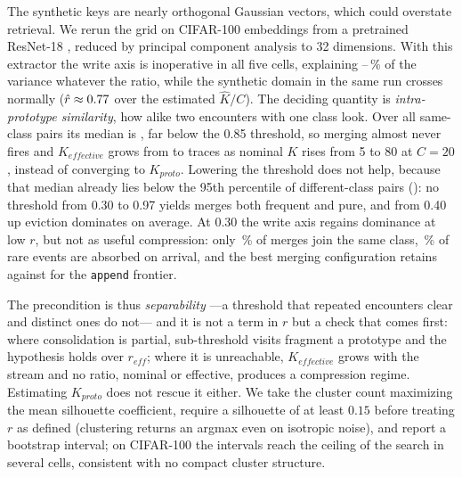 \documentclass[conference]{IEEEtran}
\begin{document}
The synthetic keys are nearly orthogonal Gaussian vectors, which could
overstate retrieval. We rerun the grid on CIFAR-100 \cite{krizhevsky2009}
embeddings from a pretrained ResNet-18 \cite{he2016}, reduced by principal
component analysis to 32 dimensions. With this extractor the write axis is
inoperative in all five cells, explaining
--\,\%
of the variance whatever the ratio, while the synthetic domain in the same run
crosses normally
($\hat r \approx \result{exp05_real_embeddings:dominios.synthetic.r_umbral|f2}{0.77}$
over the estimated $\hat K/C$). The deciding quantity is \emph{intra-prototype
similarity}, how alike two encounters with one class look. Over all
same-class pairs its median is
,
far below the 0.85 threshold, so merging almost never fires and
$K_{effective}$ grows from
 to
traces as nominal $K$ rises from 5 to 80 at $C=20$, instead of converging to
$K_{proto}$. Lowering the threshold does not help, because that median
already lies below the 95th percentile of different-class pairs
():
no threshold from 0.30 to 0.97 yields merges both frequent and pure, and from
0.40 up eviction dominates on average. At 0.30 the write axis regains dominance
at low $r$, but not as useful compression: only
\,\%
of merges join the same class,
\,\%
of rare events are absorbed on arrival, and the best merging configuration
retains
against
for the \texttt{append} frontier.

The precondition is thus \emph{separability} ---a threshold that repeated
encounters clear and distinct ones do not--- and it is not a term in $r$ but a
check that comes first: where consolidation is partial, sub-threshold visits
fragment a prototype and the hypothesis holds over $r_{eff}$; where it is
unreachable, $K_{effective}$ grows with the stream and no ratio, nominal or
effective, produces a compression regime. Estimating $K_{proto}$ does not
rescue it either. We take the cluster count maximizing the mean silhouette
coefficient, require a silhouette of at least $0.15$ before treating $r$ as
defined (clustering returns an argmax even on isotropic noise), and report a
bootstrap interval; on CIFAR-100 the intervals reach the ceiling of the search
in several cells, consistent with no compact cluster structure.
\end{document}
